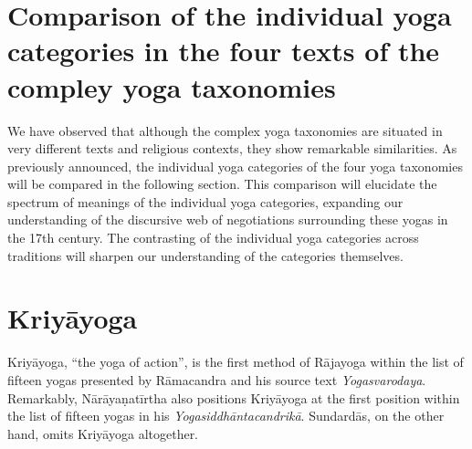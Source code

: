 \section{Comparison of the individual yoga categories in the four texts of the compley yoga taxonomies}

We have observed that although the complex yoga taxonomies are situated in very different texts and religious contexts, they show remarkable similarities. As previously announced, the individual yoga categories of the four yoga taxonomies will be compared in the following section. This comparison will elucidate the spectrum of meanings of the individual yoga categories, expanding our understanding of the discursive web of negotiations surrounding these yogas in the 17th century. The contrasting of the individual yoga categories across traditions will sharpen our understanding of the categories themselves.

\section{Kriyāyoga}

Kriyāyoga, ``the yoga of action'', is the first method of Rājayoga within the list of fifteen yogas presented by Rāmacandra and his source text \textit{Yogasvarodaya}. Remarkably, Nārāyaṇatīrtha also positions Kriyāyoga at the first position within the list of fifteen yogas in his \textit{Yogasiddhāntacandrikā}. Sundardās, on the other hand, omits Kriyāyoga altogether. 

